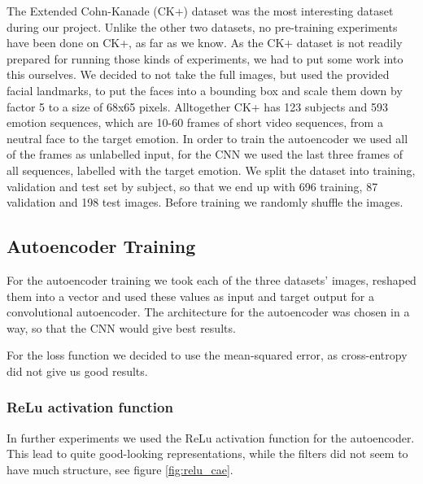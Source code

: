 \documentclass[draft]{article}
\begin{document}
      The Extended Cohn-Kanade (CK+) dataset \citep{kanade2000comprehensive,lucey2010extended} was the most interesting dataset during our project.
      Unlike the other two datasets, no pre-training experiments have been done on CK+, as far as we know.
      As the CK+ dataset is not readily prepared for running those kinds of experiments, we had to put some work into this ourselves.
      We decided to not take the full images, but used the provided facial landmarks, to put the faces into a bounding box and scale them down by factor 5 to a size of 68x65 pixels.
      Alltogether CK+ has 123 subjects and 593 emotion sequences, which are 10-60 frames of short video sequences, from a neutral face to the target emotion.
      In order to train the autoencoder we used all of the frames as unlabelled input, for the CNN we used the last three frames of all sequences, labelled with the target emotion.
      We split the dataset into training, validation and test set by subject, so that we end up with 696 training, 87 validation and 198 test images.
      Before training we randomly shuffle the images.

  \subsection{Autoencoder Training}
    For the autoencoder training we took each of the three datasets' images, reshaped them into a vector and used these values as input and target output for a convolutional autoencoder. The architecture for the autoencoder was chosen in a way, so that the CNN would give best results.

    For the loss function we decided to use the mean-squared error, as cross-entropy did not give us good results. %


    \subsubsection{ReLu activation function}
      In further experiments we used the ReLu activation function \citep{nair2010rectified} for the autoencoder.
      This lead to quite good-looking representations, while the filters did not seem to have much structure, see figure \ref{fig:relu_cae}.
\end{document}
